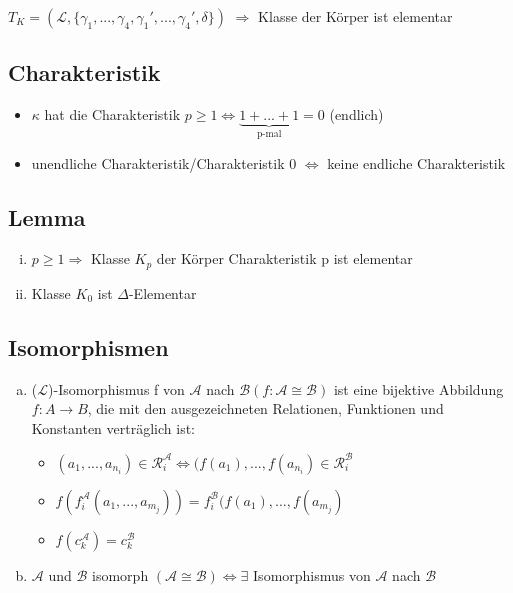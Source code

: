 \documentclass[12pt,a4paper]{article} %
\begin{document}
	$T_K = (\mathcal{L}, \{\gamma_1, ..., \gamma_4, \gamma_1', ..., \gamma_4', \delta\})$\newline
	$\Rightarrow$ Klasse der Körper ist elementar
	
	\subsection{Charakteristik}
	\begin{itemize}
		\item $\kappa$ hat die Charakteristik $p \ge 1 \Leftrightarrow \underbrace{1 + ... + 1}_\text{p-mal} = 0$ (endlich)
		\item unendliche Charakteristik/Charakteristik 0 $\Leftrightarrow$ keine endliche Charakteristik
	\end{itemize}
	
	\subsection{Lemma}
	\begin{enumerate}[(i)]
		\item $p \ge 1 \Rightarrow$ Klasse $K_p$ der Körper Charakteristik p ist elementar
		\item Klasse $K_0$ ist $\Delta$-Elementar 
	\end{enumerate}
	
	\subsection{Isomorphismen}
	\begin{enumerate}[(a)]
		\item ($\mathcal{L}$)-Isomorphismus f von $\mathcal{A}$ nach $\mathcal{B} (f: \mathcal{A} \cong \mathcal{B})$ ist eine bijektive Abbildung $f: A \rightarrow B$, die mit den ausgezeichneten Relationen, Funktionen und Konstanten verträglich ist: \begin{itemize}
			\item $(a_1, ..., a_{n_i}) \in \mathcal{R}_i^{\mathcal{A}} \Leftrightarrow (f(a_1), ..., f(a_{n_i}) \in \mathcal{R}_i^{\mathcal{B}}$
			\item $f(f_i^{\mathcal{A}}(a_1, ..., a_{m_j})) = f_i^{\mathcal{B}}(f(a_1), ..., f(a_{m_j})$
			\item $f(c_k^{\mathcal{A}}) = c_k^{\mathcal{B}}$
		\end{itemize}
		\item $\mathcal{A}$ und $\mathcal{B}$ isomorph $(\mathcal{A} \cong \mathcal{B}) \Leftrightarrow \exists$ Isomorphismus von $\mathcal{A}$ nach $\mathcal{B}$
	\end{enumerate}
	
\end{document}
